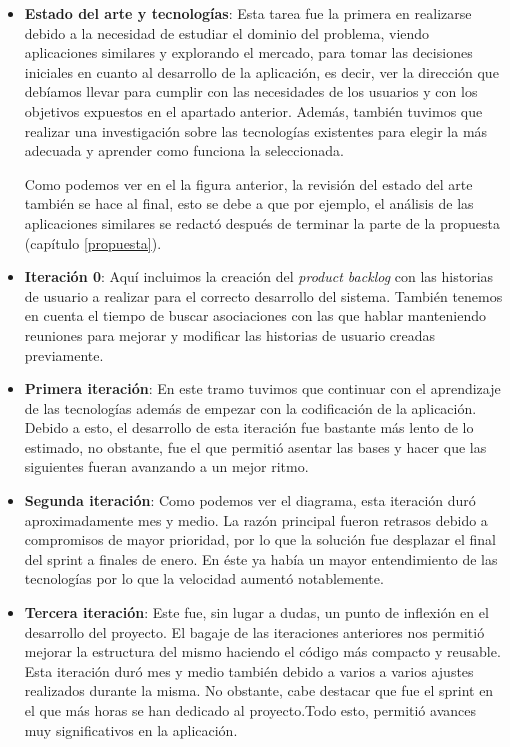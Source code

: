 \begin{itemize}
	\item \textbf{Estado del arte y tecnologías}: Esta tarea fue la primera en realizarse debido a la necesidad de estudiar el dominio del problema, viendo aplicaciones similares y explorando el mercado, para tomar las decisiones iniciales en cuanto al desarrollo de la aplicación, es decir, ver la dirección que debíamos llevar para cumplir con las necesidades de los usuarios y con los objetivos expuestos en el apartado anterior. Además, también tuvimos que realizar una investigación sobre las tecnologías existentes para elegir la más adecuada y aprender como funciona la seleccionada.
	
	Como podemos ver en el la figura anterior, la revisión del estado del arte también se hace al final, esto se debe a que por ejemplo, el análisis de las aplicaciones similares se redactó después de terminar la parte de la propuesta (capítulo \ref{propuesta}). 
	
	\item \textbf{Iteración 0}: Aquí incluimos la creación del \textit{product backlog} con las historias de usuario a realizar para el correcto desarrollo del sistema. También tenemos en cuenta el tiempo de buscar asociaciones con las que hablar manteniendo reuniones para mejorar y modificar las historias de usuario creadas previamente.
	
	\item \textbf{Primera iteración}: En este tramo tuvimos que continuar con el aprendizaje de las tecnologías además de empezar con la codificación de la aplicación. Debido a esto, el desarrollo de esta iteración fue bastante más lento de lo estimado, no obstante, fue el que permitió asentar las bases y hacer que las siguientes fueran avanzando a un mejor ritmo.
	
	\item \textbf{Segunda iteración}: Como podemos ver el diagrama, esta iteración duró aproximadamente mes y medio. La razón principal fueron retrasos debido a compromisos de mayor prioridad, por lo que la solución fue desplazar el final del sprint a finales de enero. En éste ya había un mayor entendimiento de las tecnologías por lo que la velocidad aumentó notablemente.
	
	\item \textbf{Tercera iteración}: Este fue, sin lugar a dudas, un punto de inflexión en el desarrollo del proyecto. El bagaje de las iteraciones anteriores nos permitió mejorar la estructura del mismo haciendo el código más compacto y reusable. Esta iteración duró mes y medio también debido a varios a varios ajustes realizados durante la misma. No obstante, cabe destacar que fue el sprint en el que más horas se han dedicado al proyecto.Todo esto, permitió avances muy significativos en la aplicación.
	

\end{itemize}
